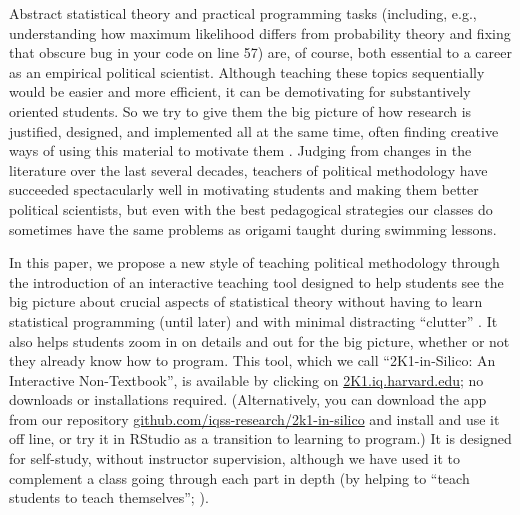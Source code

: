 \documentclass[12pt]{article}
\theoremstyle{definition}
\begin{document}
Abstract statistical theory and practical programming tasks (including, e.g., understanding how maximum likelihood differs from probability theory and fixing that obscure bug in your code on line 57) are, of course, both essential to a career as an empirical political scientist. Although teaching these topics sequentially would be easier and more efficient, it can be demotivating for substantively oriented students. So we try to give them the big picture of how research is justified, designed, and implemented all at the same time, often finding creative ways of using this material to motivate them \citep{williams2022teaching}. Judging from changes in the literature over the last several decades, teachers of political methodology have succeeded spectacularly well in motivating students and making them better political scientists, but even with the best pedagogical strategies our classes do sometimes have the same problems as origami taught during swimming lessons.

In this paper, we propose a new style of teaching political methodology through the introduction of an interactive teaching tool designed to help students see the big picture about crucial aspects of statistical theory without having to learn statistical programming (until later) and with minimal distracting ``clutter'' \citep{bailey2019teaching}. It also helps students zoom in on details and out for the big picture, whether or not they already know how to program. This tool, which we call ``2K1-in-Silico: An Interactive Non-Textbook'', is available by clicking on \href{https://2k1.iq.harvard.edu}{2K1.iq.harvard.edu}; no downloads or installations required. (Alternatively, you can download the app from our repository \href{https://github.com/iqss-research/2k1-in-silico}{github.com/iqss-research/2k1-in-silico} and install and use it off line, or try it in RStudio as a transition to learning to program.) It is designed for self-study, without instructor supervision, although we have used it to complement a class going through each part in depth (by helping to ``teach students to teach themselves''; \citealt{Schleutker2022}).
\end{document}
